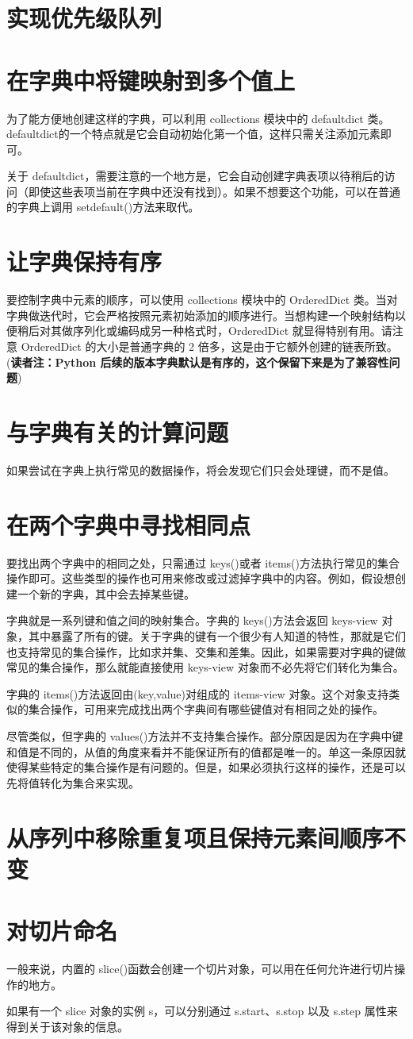 \section{实现优先级队列}
\section{在字典中将键映射到多个值上}
为了能方便地创建这样的字典，可以利用 collections 模块中的 defaultdict 类。defaultdict的一个特点就是它会自动初始化第一个值，这样只需关注添加元素即可。

关于 defaultdict，需要注意的一个地方是，它会自动创建字典表项以待稍后的访问（即使这些表项当前在字典中还没有找到）。如果不想要这个功能，可以在普通的字典上调用 setdefault()方法来取代。
\section{让字典保持有序}
要控制字典中元素的顺序，可以使用 collections 模块中的 OrderedDict 类。当对字典做迭代时，它会严格按照元素初始添加的顺序进行。当想构建一个映射结构以便稍后对其做序列化或编码成另一种格式时，OrderedDict 就显得特别有用。请注意 OrderedDict 的大小是普通字典的 2 倍多，这是由于它额外创建的链表所致。(\textbf{读者注：Python 后续的版本字典默认是有序的，这个保留下来是为了兼容性问题})
\section{与字典有关的计算问题}
如果尝试在字典上执行常见的数据操作，将会发现它们只会处理键，而不是值。
\section{在两个字典中寻找相同点}
要找出两个字典中的相同之处，只需通过 keys()或者 items()方法执行常见的集合操作即可。这些类型的操作也可用来修改或过滤掉字典中的内容。例如，假设想创建一个新的字典，其中会去掉某些键。

字典就是一系列键和值之间的映射集合。字典的 keys()方法会返回 keys-view 对象，其中暴露了所有的键。关于字典的键有一个很少有人知道的特性，那就是它们也支持常见的集合操作，比如求并集、交集和差集。因此，如果需要对字典的键做常见的集合操作，那么就能直接使用 keys-view 对象而不必先将它们转化为集合。

字典的 items()方法返回由(key,value)对组成的 items-view 对象。这个对象支持类似的集合操作，可用来完成找出两个字典间有哪些键值对有相同之处的操作。

尽管类似，但字典的 values()方法并不支持集合操作。部分原因是因为在字典中键和值是不同的，从值的角度来看并不能保证所有的值都是唯一的。单这一条原因就使得某些特定的集合操作是有问题的。但是，如果必须执行这样的操作，还是可以先将值转化为集合来实现。
\section{从序列中移除重复项且保持元素间顺序不变}
\section{对切片命名}
一般来说，内置的 slice()函数会创建一个切片对象，可以用在任何允许进行切片操作的地方。

如果有一个 slice 对象的实例 s，可以分别通过 s.start、s.stop 以及 s.step 属性来得到关于该对象的信息。
